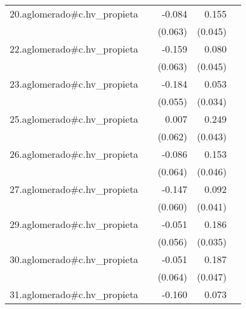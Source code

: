 {\begin{longtable}{l*{4}{D{.}{.}{-1}}}
\addlinespace
20.aglomerado#c.hv\_propieta&                     &      -0.084         &       0.155\sym{***}&                     \\
            &                     &     (0.063)         &     (0.045)         &                     \\
\addlinespace
22.aglomerado#c.hv\_propieta&                     &      -0.159\sym{*}  &       0.080         &                     \\
            &                     &     (0.063)         &     (0.045)         &                     \\
\addlinespace
23.aglomerado#c.hv\_propieta&                     &      -0.184\sym{***}&       0.053         &                     \\
            &                     &     (0.055)         &     (0.034)         &                     \\
\addlinespace
25.aglomerado#c.hv\_propieta&                     &       0.007         &       0.249\sym{***}&                     \\
            &                     &     (0.062)         &     (0.043)         &                     \\
\addlinespace
26.aglomerado#c.hv\_propieta&                     &      -0.086         &       0.153\sym{***}&                     \\
            &                     &     (0.064)         &     (0.046)         &                     \\
\addlinespace
27.aglomerado#c.hv\_propieta&                     &      -0.147\sym{*}  &       0.092\sym{*}  &                     \\
            &                     &     (0.060)         &     (0.041)         &                     \\
\addlinespace
29.aglomerado#c.hv\_propieta&                     &      -0.051         &       0.186\sym{***}&                     \\
            &                     &     (0.056)         &     (0.035)         &                     \\
\addlinespace
30.aglomerado#c.hv\_propieta&                     &      -0.051         &       0.187\sym{***}&                     \\
            &                     &     (0.064)         &     (0.047)         &                     \\
\addlinespace
31.aglomerado#c.hv\_propieta&                     &      -0.160\sym{*}  &       0.073         &                     \\

\end{longtable}}
